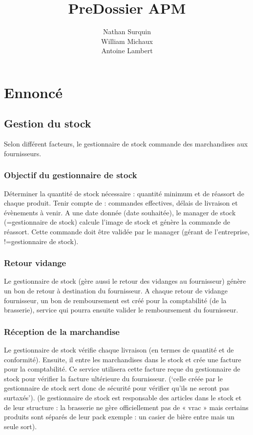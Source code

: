 \documentclass[a4paper,11pt]{article}
\title{PreDossier APM}
\author{Nathan Surquin\\
William Michaux\\
Antoine Lambert}
\begin{document}
\maketitle
\newpage
\tableofcontents
\newpage
\section{Ennoncé}
\subsection{Gestion du stock}
Selon différent facteurs, le gestionnaire de stock commande des marchandises aux fournisseurs.
\subsubsection{Objectif du gestionnaire de stock}
Déterminer la quantité de stock nécessaire : quantité minimum et de réassort de chaque     produit. Tenir compte de : commandes effectives, délais de livraison et évènements à venir. A une date donnée (date souhaitée), le manager de stock (=gestionnaire de stock) calcule l’image de stock et génère la commande de réassort. Cette commande doit être validée par le manager (gérant de l’entreprise, !=gestionnaire de stock).
\subsubsection{Retour vidange}
Le gestionnaire de stock (gère aussi le retour des vidanges au fournisseur) génère un bon de retour à destination du fournisseur. A chaque retour de vidange fournisseur, un bon de remboursement est créé pour la comptabilité (de la brasserie), service qui pourra ensuite valider le remboursement du fournisseur.
\subsubsection{Réception de la marchandise}
Le gestionnaire de stock vérifie chaque livraison (en termes de quantité et de conformité). Ensuite, il entre les marchandises dans le stock et crée une facture pour la comptabilité. Ce service utilisera cette facture reçue du gestionnaire de stock pour vérifier la facture ultérieure du fournisseur. (‘celle créée par le gestionnaire de stock sert donc de sécurité pour vérifier qu’ils ne seront pas surtaxés’). (le gestionnaire de stock est responsable des articles dans le stock et de leur structure : la brasserie ne gère officiellement pas de « vrac » mais certains produits sont séparés de leur pack exemple : un casier de bière entre mais un seule sort).
\end{document}

